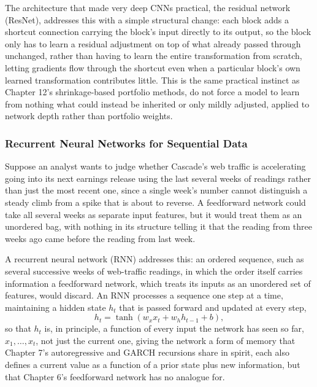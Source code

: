 \documentclass[../ai_in_finance]{subfiles}
\begin{document}
The architecture that made very deep CNNs practical, the residual network (ResNet), addresses this with a simple structural change: each block adds a shortcut connection carrying the block's input directly to its output, so the block only has to learn a residual adjustment on top of what already passed through unchanged, rather than having to learn the entire transformation from scratch, letting gradients flow through the shortcut even when a particular block's own learned transformation contributes little. This is the same practical instinct as Chapter 12's shrinkage-based portfolio methods, do not force a model to learn from nothing what could instead be inherited or only mildly adjusted, applied to network depth rather than portfolio weights.

\subsubsection*{Recurrent Neural Networks for Sequential Data}

Suppose an analyst wants to judge whether Cascade's web traffic is accelerating going into its next earnings release using the last several weeks of readings rather than just the most recent one, since a single week's number cannot distinguish a steady climb from a spike that is about to reverse. A feedforward network could take all several weeks as separate input features, but it would treat them as an unordered bag, with nothing in its structure telling it that the reading from three weeks ago came before the reading from last week.

A recurrent neural network (RNN) addresses this: an ordered sequence, such as several successive weeks of web-traffic readings, in which the order itself carries information a feedforward network, which treats its inputs as an unordered set of features, would discard. An RNN processes a sequence one step at a time, maintaining a hidden state $h_t$ that is passed forward and updated at every step,
\begin{equation*}
h_t = \tanh(w_x x_t + w_h h_{t-1} + b),
\end{equation*}
so that $h_t$ is, in principle, a function of every input the network has seen so far, $x_1, \ldots, x_t$, not just the current one, giving the network a form of memory that Chapter 7's autoregressive and GARCH recursions share in spirit, each also defines a current value as a function of a prior state plus new information, but that Chapter 6's feedforward network has no analogue for.
\end{document}
